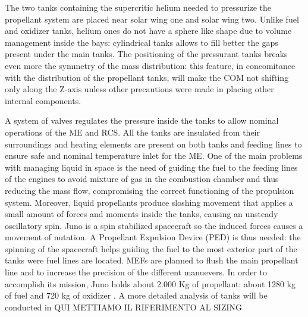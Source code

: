 The two tanks\cite{2tankshe} containing the supercritic helium needed to pressurize the propellant system are placed near solar wing one and solar wing two. Unlike fuel and oxidizer tanks, helium ones do not have a sphere like shape due to volume management inside the bays\cite{he_tank}: cylindrical tanks allows to fill better the gaps present under the main tanks. The positioning of the pressurant tanks breaks even more the symmetry of the mass distribution: this feature, in concomitance with the distribution of the propellant tanks, will make the COM not shifting only along the Z-axis unless other precautions were made in placing other internal components. 

A system of valves regulates the pressure inside the tanks to allow nominal operations of the ME and RCS. All the tanks are insulated from their surroundings and heating elements are present on both tanks and feeding lines to ensure safe and nominal temperature inlet for the ME\cite{Leros}.
One of the main problems with managing liquid in space is the need of guiding the fuel to the feeding lines of the engines to avoid mixture of gas in the combustion chamber and thus reducing the mass flow, compromising the correct functioning of the propulsion system. Moreover, liquid propellants produce sloshing movement that applies a small amount of forces and moments inside the tanks, causing an unsteady oscillatory spin. Juno is a spin stabilized spacecraft so the induced forces causes a movement of nutation. A Propellant Expulsion Device (PED) is thus needed: the spinning of the spacecraft helps guiding the fuel to the most exterior part of the tanks were fuel lines are located\cite{slosh}. 
MEFs are planned to flush the main propellant line and to increase the precision of the different manuevers. 
In order to accomplish its mission, Juno holds about 2.000 Kg of propellant: about 1280 kg of fuel and 720 kg of oxidizer \cite{junno_inner}. A more detailed analysis of tanks will be conducted in QUI METTIAMO IL RIFERIMENTO AL SIZING
 











